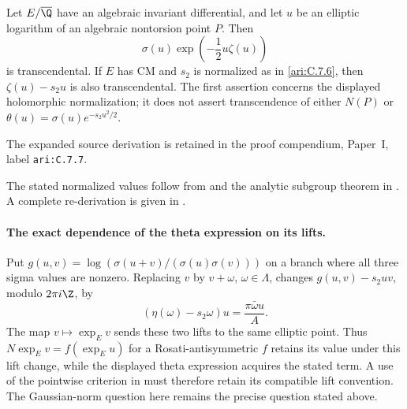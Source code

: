 \begin{cited}\hypertarget{tag-001G}{}\label{ari:C.7.7}

Let $E/\overline{\Q}$ have an algebraic invariant differential,
and let $u$ be an elliptic logarithm of an algebraic nontorsion
point $P$. Then
\[
 \sigma(u)\exp\left(-\frac12u\zeta(u)\right)
\]
is transcendental. If $E$ has CM and $s_2$ is normalized as in
\ref{ari:C.7.6}, then $\zeta(u)-s_2u$ is also transcendental. The first
assertion concerns the displayed holomorphic normalization;
it does not assert transcendence of either $N(P)$ or
$\theta(u)=\sigma(u)e^{-s_2u^2/2}$.
\end{cited}
The expanded source derivation is retained in the proof compendium, Paper~I, label \nolinkurl{ari:C.7.7}.




The stated normalized values follow from \citet[Theorem~1 and Corollary~1]{waldschmidt1979sigma} and the analytic subgroup theorem in \citet[Theorem~6.1, arXiv v8, p.~43]{huber2022}. A complete re-derivation is given in .


\paragraph{The exact dependence of the theta expression on its lifts.}
Put
$g(u,v)=\log(\sigma(u+v)/(\sigma(u)\sigma(v)))$ on a branch where
all three sigma values are nonzero. Replacing $v$ by $v+\omega$,
$\omega\in\Lambda$, changes $g(u,v)-s_2uv$, modulo $2\pi i\Z$, by
\[
 (\eta(\omega)-s_2\omega)u=\frac{\pi\bar\omega u}{A}.
\]
The map $v\mapsto\exp_Ev$ sends these two lifts to the same
elliptic point. Thus $N\exp_Ev=f(\exp_Eu)$ for a
Rosati-antisymmetric $f$ retains its value under this lift change,
while the displayed theta expression acquires the stated term.
A use of the pointwise criterion in
\citet[final slide, comment~(c)]{bertrand2017} must therefore retain
its compatible lift convention. The Gaussian-norm question here
remains the precise question stated above.

